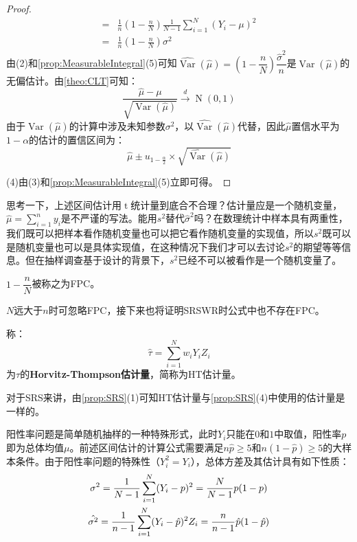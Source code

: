 \begin{proof}
\begin{align*}
		=&\frac{1}{n}\left(1-\frac{n}{N}\right)\frac{1}{N-1}\sum\limits_{i=1}^N(Y_i-\mu)^2 \\ 
		=&\frac{1}{n}\left(1-\frac{n}{N}\right)\sigma^2
	\end{align*}
	由(2)和\cref{prop:MeasurableIntegral}(5)可知$\widehat{\operatorname{Var}}(\hat{\mu})=\left(1-\dfrac{n}{N}\right)\dfrac{\hat{\sigma}^2}{n}$是$\operatorname{Var}(\hat{\mu})$的无偏估计。由\cref{theo:CLT}可知：
	\begin{equation*}
		\frac{\hat{\mu}-\mu}{\sqrt{\operatorname{Var}(\hat{\mu})}}\overset{d}{\longrightarrow}\operatorname{N}(0,1)
	\end{equation*}
	由于$\operatorname{Var}(\hat{\mu})$的计算中涉及未知参数$\sigma^2$，以$\widehat{\operatorname{Var}}(\hat{\mu})$代替，因此$\hat{\mu}$置信水平为$1-\alpha$的估计的置信区间为：
	\begin{equation*}
		\hat{\mu}\pm u_{1-\frac{\alpha}{2}}\times\sqrt{\widehat{\operatorname{Var}}(\hat{\mu})}
	\end{equation*}\par
	(4)由(3)和\cref{prop:MeasurableIntegral}(5)立即可得。
\end{proof}
\begin{note}
	思考一下，上述区间估计用$\operatorname{t}$统计量到底合不合理？估计量应是一个随机变量，$\hat{\mu}=\sum\limits_{i=1}^{n}y_i$是不严谨的写法。能用$s^2$替代$\hat{\sigma}^2$吗？在数理统计中样本具有两重性，我们既可以把样本看作随机变量也可以把它看作随机变量的实现值，所以$s^2$既可以是随机变量也可以是具体实现值，在这种情况下我们才可以去讨论$s^2$的期望等等信息。但在抽样调查基于设计的背景下，$s^2$已经不可以被看作是一个随机变量了。
\end{note}
\begin{definition}
	$1-\dfrac{n}{N}$被称之为\gls{FPC}。
\end{definition}
\begin{note}
	$N$远大于$n$时可忽略FPC，接下来也将证明SRSWR时公式中也不存在FPC。
\end{note}
\begin{definition}
	称：
	\begin{equation*}
		\hat{\tau}=\sum\limits_{i=1}^Nw_iY_iZ_i
	\end{equation*}
	为$\tau$的\textbf{Horvitz-Thompson估计量}，简称为HT估计量。
\end{definition}
\begin{note}
	对于SRS来讲，由\cref{prop:SRS}(1)可知HT估计量与\cref{prop:SRS}(4)中使用的估计量是一样的。
\end{note}
\begin{note}
	阳性率问题是简单随机抽样的一种特殊形式，此时$Y_i$只能在$0$和$1$中取值，阳性率$p$即为总体均值$\mu$。前述区间估计的计算公式需要满足$n\hat{p}\geqslant5$和$n(1-\hat{p})\geqslant 5$的大样本条件。由于阳性率问题的特殊性（$Y_i^2=Y_i$），总体方差及其估计具有如下性质：
	\begin{gather*}
		\sigma^2=\frac{1}{N-1}\sum_{i=1}^N(Y_i-p)^2=\frac{N}{N-1}p(1-p)\notag \\
		\hat{\sigma^2}=\frac{1}{n-1}\sum_{i=1}^{N}(Y_i-\hat{p})^2Z_i=\frac{n}{n-1}\hat{p}(1-\hat{p})
	\end{gather*}
\end{note}

